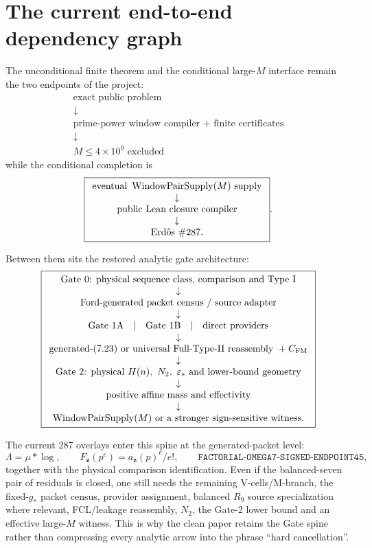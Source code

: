 \documentclass[11pt]{article}
\theoremstyle{definition}
\newcommand{\1}{\mathbf 1}
\newcommand{\WPS}{\operatorname{WindowPairSupply}}
\begin{document}
{{{\section{The current end-to-end dependency graph}

The unconditional finite theorem and the conditional large-$M$ interface remain the two endpoints of the
project:
\[
\boxed{\begin{array}{c}
\text{exact public problem}\\
\downarrow\\
\text{prime-power window compiler + finite certificates}\\
\downarrow\\
M\le4\times10^9\text{ excluded}
\end{array}}
\]
while the conditional completion is
\[
\boxed{\begin{array}{c}
\text{eventual }\WPS(M)\text{ supply}\\
\downarrow\\
\text{public Lean closure compiler}\\
\downarrow\\
\text{Erd\H{o}s \#287.}
\end{array}}.
\]

Between them sits the restored analytic gate architecture:
\[
\boxed{
\begin{array}{c}
\text{Gate 0: physical sequence class, comparison and Type I}\\
\downarrow\\
\text{Ford-generated packet census / source adapter}\\
\downarrow\\
\text{Gate 1A}\quad\vert\quad\text{Gate 1B}\quad\vert\quad\text{direct providers}\\
\downarrow\\
\text{generated-(7.23) or universal Full-Type-II reassembly }+C_{\rm FM}\\
\downarrow\\
\text{Gate 2: physical }H(n),\ N_2,\ \varepsilon_*\text{ and lower-bound geometry}\\
\downarrow\\
\text{positive affine mass and effectivity}\\
\downarrow\\
\WPS(M)\text{ or a stronger sign-sensitive witness.}
\end{array}}
\]

The current 287 overlays enter this spine at the generated-packet level:
\[
\Lambda=\mu*\log,\qquad
F_{\mathbf z}(p^e)=a_{\mathbf z}(p)^e/e!,\qquad
\texttt{FACTORIAL-OMEGA7-SIGNED-ENDPOINT45},
\]
together with the physical comparison identification.  Even if the balanced-seven pair of residuals is closed,
one still needs the remaining V-cells/M-branch, the fixed-$g_*$ packet census, provider assignment, balanced
$R_9$ source specialization where relevant, FCL/leakage reassembly, $N_2$, the Gate-2 lower bound and an
effective large-$M$ witness.  This is why the clean paper retains the Gate spine rather than compressing every
analytic arrow into the phrase ``hard cancellation''.

}}}
\end{document}
